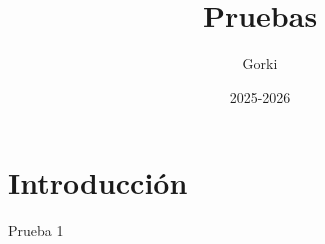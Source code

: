 \documentclass{article}
\title{Pruebas}
\author{Gorki}
\date{2025-2026}
\begin{document}
\maketitle
\section{Introducción}
Prueba 1 \cite{Bohren}


% 
% 
\printbibliography[title={Bibliografía}]
\end{document}
